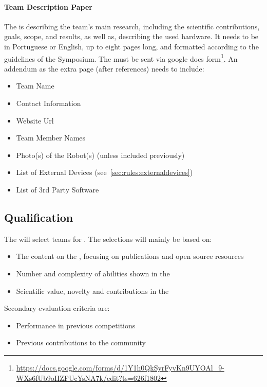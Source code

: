 \paragraph{Team Description Paper}
\label{sec:rules:application:tdp}
The \TDP{} is describing the team's main research, including the scientific contributions, goals, scope, and results, as well as, describing the used hardware. It needs to be in Portuguese or English, up to eight pages long, and formatted according to the guidelines of the \RoboCup{} Symposium. 
The \TDP{} must be sent via google docs form\footnote{\url{https://docs.google.com/forms/d/1Y1h0QkSyrFyvKn9UYOAl_9-WXs6fUb9oHZFUcYsNA7k/edit?ts=626f1802}}.
An addendum as the extra page (after references) needs to include:
\begin{itemize}
	\item Team Name
	\item Contact Information
	\item Website Url
	\item Team Member Names
	\item Photo(s) of the Robot(s) (unless included previously) 
	\item List of External Devices (see~\ref{sec:rules:externaldevices})
	\item List of 3rd Party Software
\end{itemize}

\subsection{Qualification}
\label{sec:rules:qualification}
The \OC{} will select teams for \Qualification{}. The selections will mainly be based on:
\begin{itemize}
	\item The content on the \TeamWebsite{}, focusing on publications and open source resources
	\item Number and complexity of abilities shown in the \TeamVideo{}
	\item Scientific value, novelty and contributions in the \TDP{}

\end{itemize}
Secondary evaluation criteria are:
\begin{itemize}
	\item Performance in previous competitions
	\item Previous contributions to the \AtHome{} community
\end{itemize}


